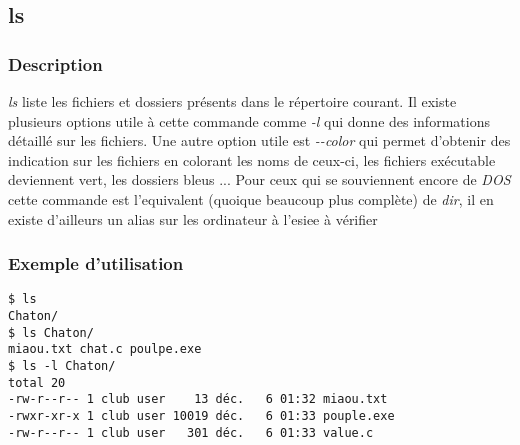 \subsection{ls}
\subsubsection{Description}
\emph{ls} liste les fichiers et dossiers présents dans le répertoire courant.
Il existe plusieurs options utile à cette commande comme \emph{-l} qui donne des informations détaillé sur les fichiers.
Une autre option utile est \emph{-{}-color} qui permet d'obtenir des indication sur les fichiers en colorant les noms de ceux-ci, les fichiers exécutable deviennent vert, les dossiers bleus ...
Pour ceux qui se souviennent encore de \emph{DOS} cette commande est l'equivalent (quoique beaucoup plus complète) de \emph{dir}, il en existe d'ailleurs un alias sur les ordinateur à l'esiee \textcolor{grey2}{à vérifier}

\subsubsection{Exemple d'utilisation}
\begin{lstlisting}
$ ls
Chaton/
$ ls Chaton/
miaou.txt chat.c poulpe.exe
$ ls -l Chaton/
total 20
-rw-r--r-- 1 club user    13 déc.   6 01:32 miaou.txt
-rwxr-xr-x 1 club user 10019 déc.   6 01:33 pouple.exe
-rw-r--r-- 1 club user   301 déc.   6 01:33 value.c
\end{lstlisting}

